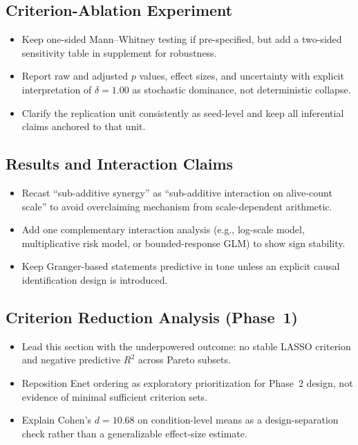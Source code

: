 \documentclass[11pt]{article}
\begin{document}
\subsection*{Criterion-Ablation Experiment}
\begin{itemize}
  \item Keep one-sided Mann--Whitney testing if pre-specified, but add a two-sided sensitivity table in supplement for robustness.
  \item Report raw and adjusted $p$ values, effect sizes, and uncertainty with explicit interpretation of $\delta=1.00$ as stochastic dominance, not deterministic collapse.
  \item Clarify the replication unit consistently as seed-level and keep all inferential claims anchored to that unit.
\end{itemize}

\subsection*{Results and Interaction Claims}
\begin{itemize}
  \item Recast ``sub-additive synergy'' as ``sub-additive interaction on alive-count scale'' to avoid overclaiming mechanism from scale-dependent arithmetic.
  \item Add one complementary interaction analysis (e.g., log-scale model, multiplicative risk model, or bounded-response GLM) to show sign stability.
  \item Keep Granger-based statements predictive in tone unless an explicit causal identification design is introduced.
\end{itemize}

\subsection*{Criterion Reduction Analysis (Phase~1)}
\begin{itemize}
  \item Lead this section with the underpowered outcome: no stable LASSO criterion and negative predictive $R^2$ across Pareto subsets.
  \item Reposition Enet ordering as exploratory prioritization for Phase~2 design, not evidence of minimal sufficient criterion sets.
  \item Explain Cohen's $d=10.68$ on condition-level means as a design-separation check rather than a generalizable effect-size estimate.
\end{itemize}
\end{document}
